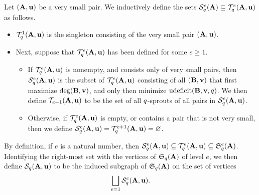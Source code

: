\documentclass{article}
\begin{document}
\begin{definition}
	\label{subgraph: D}
   Let $(\mathbf{A}, \mathbf{u})$ be a very small pair.  We inductively define the sets $\mathcal{S}_{q}^e(\mathbf{A}) \subseteq \mathcal{T}_{q}^e(\mathbf{A}, \mathbf{u})$ as follows.
   
   \begin{itemize}
   \item $\mathcal{T}_{q}^1(\mathbf{A}, \mathbf{u})$ is the singleton consisting of the very small pair $(\mathbf{A}, \mathbf{u})$.  
   \item Next, suppose that $\mathcal{T}_{q}^e(\mathbf{A}, \mathbf{u})$ has been defined for some $e \geq 1$.
   \begin{itemize}
   \item  If $\mathcal{T}_{q}^e(\mathbf{A}, \mathbf{u})$ is nonempty, and consists only of very small pairs, then $
   \mathcal{S}_{q}^e(\mathbf{A}, \mathbf{u})$ is the subset of $\mathcal{T}_{q}^e(\mathbf{A}, \mathbf{u})$ consisting of all $(\mathbf{B},\mathbf{v})$ that first maximize $\operatorname{deg}(\mathbf{B},\mathbf{v})$, and only then minimize $\operatorname{udeficit}(\mathbf{B},\mathbf{v},q)$.  We then define $\mathcal{T}_{e+1}(\mathbf{A},\mathbf{u})$ to be the set of all $q$-sprouts of all pairs in $\mathcal{S}_{q}^e(\mathbf{A},\mathbf{u})$.
      \item Otherwise, if $\mathcal{T}_{q}^e(\mathbf{A}, \mathbf{u})$ is empty,  or contains a pair that is not very small, then we define $\mathcal{S}_{q}^e(\mathbf{A},\mathbf{u})=\mathcal{T}_{q}^{e+1}(\mathbf{A},\mathbf{u}) = \varnothing$.
   \end{itemize}
   \end{itemize}
   
   By definition, if $e$ is a natural number, then $\mathcal{S}_{q}^e(\mathbf{A},\mathbf{u}) \subseteq \mathcal{T}_{q}^e(\mathbf{A},\mathbf{u}) \subseteq \mathfrak{S}_{q}^e(\mathbf{A})$.  Identifying the right-most set with the vertices of $\mathfrak{S}_q(\mathbf{A})$ of level $e$, we then define $\mathcal{S}_{q}(\mathbf{A},\mathbf{u})$ to be the induced subgraph of $\mathfrak{S}_{q}(\mathbf{A})$ on the set of vertices
   \[ \bigsqcup_{e=1} \mathcal{S}_{q}^e(\mathbf{A},\mathbf{u}). \]


\end{definition}
\end{document}
